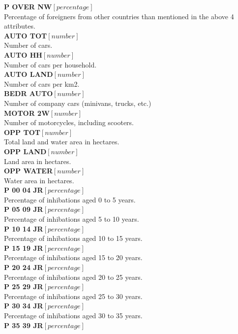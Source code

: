 \textbf{P OVER NW}$ [percentage]$ \\
Percentage of foreigners from other countries than mentioned in the above 4 attributes. \\
\textbf{AUTO TOT}$ [number]$ \\
Number of cars. \\
\textbf{AUTO HH}$ [number]$ \\
Number of cars per household. \\
\textbf{AUTO LAND}$ [number]$ \\
Number of cars per km2. \\ 
\textbf{BEDR AUTO}$ [number]$ \\
Number of company cars (minivans, trucks, etc.) \\
\textbf{MOTOR 2W}$ [number]$ \\
Number of motorcycles, including scooters. \\
\textbf{OPP TOT}$ [number]$ \\
Total land and water area in hectares. \\
\textbf{OPP LAND}$ [number]$ \\
Land area in hectares. \\
\textbf{OPP WATER}$ [number] $\\
Water area in hectares. \\
\textbf{P 00 04 JR}$ [percentage]$ \\
Percentage of inhibations aged 0 to 5 years. \\
\textbf{P 05 09 JR}$ [percentage]$ \\
Percentage of inhibations aged 5 to 10 years. \\
\textbf{P 10 14 JR}$ [percentage]$ \\
Percentage of inhibations aged 10 to 15 years. \\
\textbf{P 15 19 JR}$ [percentage]$ \\
Percentage of inhibations aged 15 to 20 years. \\
\textbf{P 20 24 JR}$ [percentage]$ \\
Percentage of inhibations aged 20 to 25 years. \\
\textbf{P 25 29 JR}$ [percentage]$\\
Percentage of inhibations aged 25 to 30 years. \\
\textbf{P 30 34 JR}$ [percentage]$ \\
Percentage of inhibations aged 30 to 35 years. \\
\textbf{P 35 39 JR}$ [percentage]$ \\
